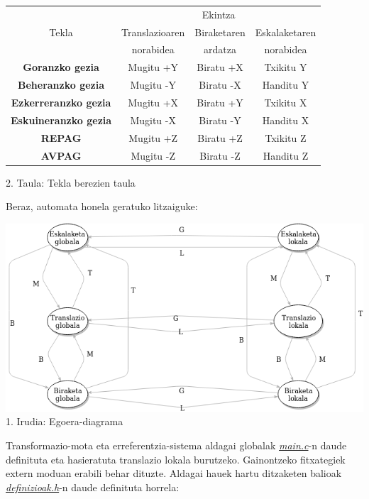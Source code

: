 \documentclass[12pt]{article}
\newcommand{\fitxategi}[1] {\underline{\textit{#1}}}
\newcommand{\tekla}[1] {\textbf{#1}}
\begin{document}
\begin{center}

\begin{tabular}{|c|c|c|c|}
																			\hline
	\multirow{3}{*}{Tekla}		& \multicolumn{3}{|c|}{Ekintza} 		\\	\cline{2-4}
	& Translazioaren  & Biraketaren  & Eskalaketaren 					\\ 
	&  norabidea &  ardatza &  norabidea 								\\	\hline
	\tekla{Goranzko gezia}		 &  Mugitu +Y & Biratu +X & Txikitu Y	\\	\hline
	\tekla{Beheranzko gezia}	 &  Mugitu -Y & Biratu -X & Handitu Y	\\	\hline
	\tekla{Ezkerreranzko gezia}&  Mugitu +X & Biratu +Y & Txikitu X	\\	\hline
	\tekla{Eskuineranzko gezia}&  Mugitu -X & Biratu -Y & Handitu X	\\	\hline
	\tekla{REPAG}				 &  Mugitu +Z & Biratu +Z & Txikitu Z	\\	\hline
	\tekla{AVPAG}				 &  Mugitu -Z & Biratu -Z & Handitu Z	\\	\hline
\end{tabular}

\vspace{0.3cm}
2. Taula: Tekla berezien taula
\end{center}


Beraz, automata honela geratuko litzaiguke:

\begin{center}
\includegraphics[scale=0.6]{egoeradiagrama.png}\\
\vspace{0.3cm}
1. Irudia: Egoera-diagrama
\end{center}


Transformazio-mota eta erreferentzia-sistema aldagai globalak \fitxategi{main.c}-n daude definituta eta hasieratuta translazio lokala burutzeko. Gainontzeko fitxategiek extern moduan erabili behar dituzte. Aldagai hauek hartu ditzaketen balioak \fitxategi{definizioak.h}-n daude definituta horrela:
\end{document}
